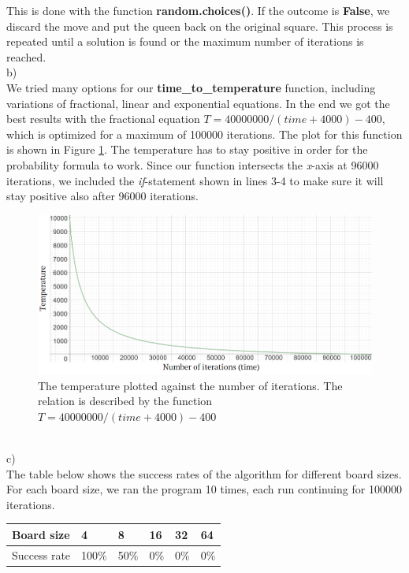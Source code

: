 \documentclass{article}
\begin{document}
This is done with the function \textbf{random.choices()}. If the outcome is \textbf{False}, we discard the move and put the queen back on the original square. This process is repeated until a solution is found or the maximum number of iterations is reached.
\\
b) 
\\
We tried many options for our \textbf{time\_to\_temperature} function, including variations of fractional, linear and exponential equations. In the end we got the best results with the fractional equation $ T = 40000000/(time + 4000) - 400 $, which is optimized for a maximum of 100000 iterations. The plot for this function is shown in Figure \ref{fig:image}. The temperature has to stay positive in order for the probability formula to work. Since our function intersects the \emph{x}-axis at 96000 iterations, we included the \emph{if}-statement shown in lines 3-4 to make sure it will stay positive also after 96000 iterations.
\begin{figure}[h]
		\centering
		\includegraphics[width=1.2\textwidth]{figure1.png}
		\caption{The temperature plotted against the number of iterations. The relation is described by the function $ T = 40000000/(time + 4000) - 400 $}
		\label{fig:image}
	\end{figure}
\\
c)
\\
The table below shows the success rates of the algorithm for different board sizes. For each board size, we ran the program 10 times, each run continuing for 100000 iterations. 
\begin{center}
\begin{tabular}{|l|l|l|l|l|l|}
\hline
Board size & 4 & 8 & 16 & 32 & 64 \\ \hline
Success rate & 100\% & 50\% & 0\% & 0\% & 0\%  \\ \hline

\end{tabular}
\end{center}
\end{document}
